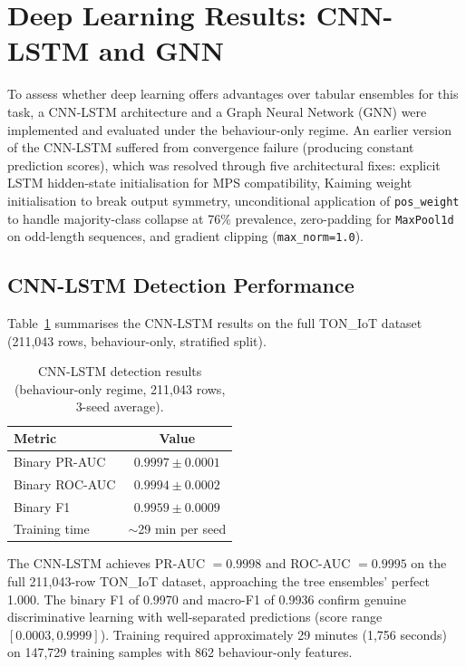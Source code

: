 \documentclass[12pt,a4paper]{report}
\begin{document}
\section{Deep Learning Results: CNN-LSTM and GNN}
\label{sec:cnnlstm-results}

To assess whether deep learning offers advantages over tabular ensembles for this task, a CNN-LSTM architecture and a Graph Neural Network (GNN) were implemented and evaluated under the behaviour-only regime. An earlier version of the CNN-LSTM suffered from convergence failure (producing constant prediction scores), which was resolved through five architectural fixes: explicit LSTM hidden-state initialisation for MPS compatibility, Kaiming weight initialisation to break output symmetry, unconditional application of \texttt{pos\_weight} to handle majority-class collapse at 76\% prevalence, zero-padding for \texttt{MaxPool1d} on odd-length sequences, and gradient clipping (\texttt{max\_norm=1.0}).

\subsection{CNN-LSTM Detection Performance}
\label{sec:cnnlstm-detection}

Table~\ref{tab:cnnlstm} summarises the CNN-LSTM results on the full TON\_IoT dataset (211,043 rows, behaviour-only, stratified split).

\begin{table}[H]
\centering
\caption{CNN-LSTM detection results (behaviour-only regime, 211,043 rows, 3-seed average).}
\label{tab:cnnlstm}
\begin{tabular}{lc}
\toprule
\textbf{Metric} & \textbf{Value} \\
\midrule
Binary PR-AUC & $0.9997 \pm 0.0001$ \\
Binary ROC-AUC & $0.9994 \pm 0.0002$ \\
Binary F1 & $0.9959 \pm 0.0009$ \\
Training time & $\sim$29 min per seed \\
\bottomrule
\end{tabular}
\end{table}

The CNN-LSTM achieves PR-AUC $= 0.9998$ and ROC-AUC $= 0.9995$ on the full 211,043-row TON\_IoT dataset, approaching the tree ensembles' perfect 1.000. The binary F1 of 0.9970 and macro-F1 of 0.9936 confirm genuine discriminative learning with well-separated predictions (score range $[0.0003, 0.9999]$). Training required approximately 29 minutes (1,756 seconds) on 147,729 training samples with 862 behaviour-only features.
\end{document}
